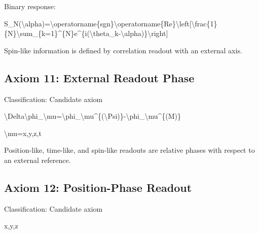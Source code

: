 \documentclass[
  a4paper,
]{article}
\newenvironment{Shaded}{}{}
\newcommand{\NormalTok}[1]{#1}
\begin{document}
Binary response:

\begin{Shaded}
\begin{Highlighting}[]
\NormalTok{S\_N(\textbackslash{}alpha)=\textbackslash{}operatorname\{sgn\}\textbackslash{}operatorname\{Re\}\textbackslash{}left[\textbackslash{}frac\{1\}\{N\}\textbackslash{}sum\_\{k=1\}\^{}\{N\}e\^{}\{i(\textbackslash{}theta\_k{-}\textbackslash{}alpha)\}\textbackslash{}right]}
\end{Highlighting}
\end{Shaded}

Spin-like information is defined by correlation readout with an external
axis.

\subsection{Axiom 11: External Readout
Phase}\label{axiom-11-external-readout-phase}

Classification: Candidate axiom

\begin{Shaded}
\begin{Highlighting}[]
\NormalTok{\textbackslash{}Delta\textbackslash{}phi\_\textbackslash{}mu=\textbackslash{}phi\_\textbackslash{}mu\^{}\{(\textbackslash{}Psi)\}{-}\textbackslash{}phi\_\textbackslash{}mu\^{}\{(M)\}}
\end{Highlighting}
\end{Shaded}

\begin{Shaded}
\begin{Highlighting}[]
\NormalTok{\textbackslash{}mu=x,y,z,t}
\end{Highlighting}
\end{Shaded}

Position-like, time-like, and spin-like readouts are relative phases
with respect to an external reference.

\subsection{Axiom 12: Position-Phase
Readout}\label{axiom-12-position-phase-readout}

Classification: Candidate axiom

\begin{Shaded}
\begin{Highlighting}[]
\NormalTok{x,y,z}
\end{Highlighting}
\end{Shaded}
\end{document}
